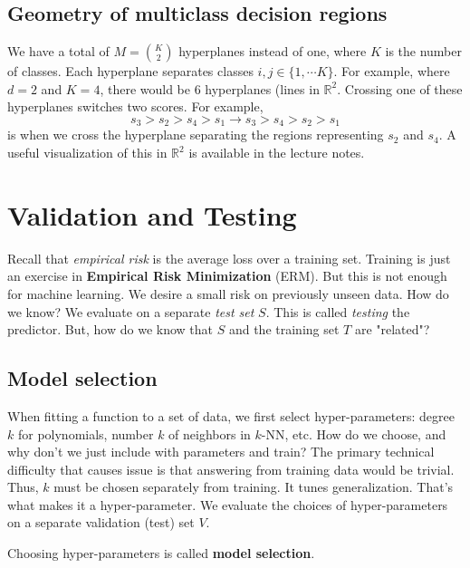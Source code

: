 \documentclass[titlepage, 12pt, leqno]{article}
\begin{document}
\subsection{Geometry of multiclass decision regions}
We have a total of $M = \binom{K}{2}$ hyperplanes instead of one, where $K$ is the
number of classes. Each hyperplane separates classes $i,j \in \{1, \cdots K\}$.
For example, where $d=2$ and $K=4$, there would be 6 hyperplanes (lines in 
$ \mathbb{R}^{2}$. Crossing one of these hyperplanes switches two scores. For
example,
\[
s_{3}> s_{2} > s_{4} > s_{1} \rightarrow s_{3} > s_{4} > s_{2} > s_{1}
\]
is when we cross the hyperplane separating the regions representing $s_{2}$ and
$s_{4}$. A useful visualization of this in $ \mathbb{R}^{2}$ is available in the
lecture notes.

\pagebreak
\section{Validation and Testing}

Recall that \textit{empirical risk} is the average loss over a training set. 
Training is just an exercise in \textbf{Empirical Risk Minimization} (ERM). But
this is not enough for machine learning. We desire a small risk on previously
unseen data. How do we know? We evaluate on a separate \textit{test set} $S$. This
is called \textit{testing} the predictor. But, how do we know that $S$ and the
training set $T$ are "related"?

\subsection{Model selection}
When fitting a function to a set of data, we first select hyper-parameters: 
degree $k$ for polynomials, number $k$ of neighbors in $k$-NN, etc. How do we 
choose, and why don't we just include with parameters and train? The primary 
technical difficulty that causes issue is that answering from training data
would be trivial. Thus, $k$ must be chosen separately from training. It tunes
generalization. That's what makes it a hyper-parameter. We evaluate the
choices of hyper-parameters on a separate validation (test) set $V$.

\begin{definition}
    Choosing hyper-parameters is called \textbf{model selection}.
\end{definition}
\end{document}
